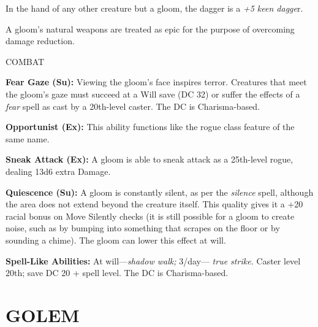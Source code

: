 \documentclass{article}
\begin{document}
{In the hand of any other creature but a gloom, the dagger is a \textit{+5 keen 
dagge}r. 

A gloom's natural weapons are treated as epic for the purpose of overcoming damage 
reduction.

COMBAT 

\textbf{Fear Gaze (Su):} Viewing the gloom's face inspires terror. Creatures that 
meet the gloom's gaze must succeed at a Will save (DC 32) or suffer the effects 
of a \textit{fear }spell as cast by a 20th-level caster.   The DC is Charisma-based.

\textbf{Opportunist (Ex):} This ability functions like the rogue class feature 
of the same name. 

\textbf{Sneak Attack (Ex):} A gloom is able to sneak attack as a 25th-level rogue, 
dealing 13d6 extra Damage. 

\textbf{Quiescence (Su):} A gloom is constantly silent, as per the \textit{silence 
}spell, although the area does not extend beyond the creature itself. This quality 
gives it a +20 racial bonus on Move Silently checks (it is still possible for a 
gloom to create noise, such as by bumping into something that scrapes on the floor 
or by sounding a chime). The gloom can lower this effect at will. 

\textbf{Spell-Like Abilities: }At will---\textit{shadow walk; }3/day--- \textit{true 
strike. }Caster level 20th; save DC 20 + spell level.  The DC is Charisma-based.

\vspace{12pt}
\section*{{\LARGE{}GOLEM}}

}
\end{document}
